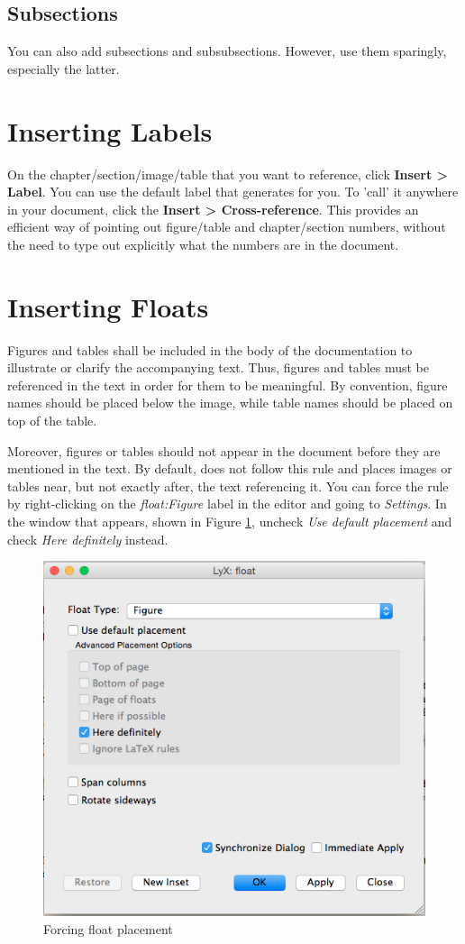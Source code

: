 \subsection{Subsections}

You can also add subsections and subsubsections. However, use them
sparingly, especially the latter.

\section{Inserting Labels}

On the chapter/section/image/table that you want to reference, click
\textbf{Insert \textgreater{} Label}. You can use the default label
that \LyX{} generates for you. To 'call' it anywhere in your document,
click the \textbf{Insert \textgreater{} Cross-reference}. This provides
an efficient way of pointing out figure/table and chapter/section
numbers, without the need to type out explicitly what the numbers
are in the document.

\section{Inserting Floats}

Figures and tables shall be included in the body of the documentation
to illustrate or clarify the accompanying text. Thus, figures and
tables must be referenced in the text in order for them to be meaningful.
By convention, figure names should be placed below the image, while
table names should be placed on top of the table. 

Moreover, figures or tables should not appear in the document before
they are mentioned in the text. By default, \LyX{} does not follow
this rule and places images or tables near, but not exactly after,
the text referencing it. You can force the rule by right-clicking
on the \textit{float:Figure} label in the \LyX{} editor and going to
\textit{Settings}. In the window that appears, shown in Figure \ref{fig:Forcing-float-placement},
uncheck \textit{Use default placement} and check \textit{Here definitely}
instead.

\begin{figure}[H]
\begin{centering}
\includegraphics[width=0.5\columnwidth]{images/placement}
\par\end{centering}
\caption{Forcing float placement\label{fig:Forcing-float-placement}}

\end{figure}


